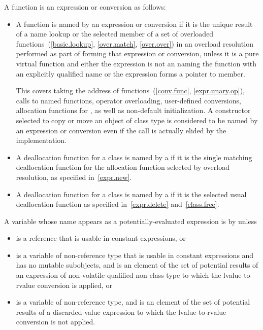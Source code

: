 \pnum
A function is 
an expression or conversion as follows:
\begin{itemize}
\item
  A function is named by an expression or conversion
  if it is the unique result of a name lookup or the selected member
  of a set of overloaded functions~(\ref{basic.lookup}, \ref{over.match}, \ref{over.over})
  in an overload resolution performed
  as part of forming that expression or conversion,
  unless it is a pure virtual function and either
  the expression is not an  naming the function with
  an explicitly qualified name or
  the expression forms a pointer to member.
  \begin{note}
This covers
  taking the address of functions~(\ref{conv.func}, \ref{expr.unary.op}),
  calls to named functions,
  operator overloading,
  user-defined conversions,
  allocation functions for , as well as
  non-default initialization.
  A constructor selected to copy or move an object of class type
  is considered to be named by an expression or conversion
  even if the call is actually elided by the implementation.
\end{note}
\item
  A deallocation function for a class
  is named by a 
  if it is the single matching deallocation function
  for the allocation function selected by overload resolution,
  as specified in~\ref{expr.new}.
\item
  A deallocation function for a class
  is named by a 
  if it is the selected usual deallocation function
  as specified in~\ref{expr.delete} and~\ref{class.free}.
\end{itemize}

\pnum
A variable  whose name appears as a
potentially-evaluated expression 
is  by  unless
\begin{itemize}
\item
   is a reference that is
  usable in constant expressions, or
\item
   is a variable of non-reference type that is
  usable in constant expressions and has no mutable subobjects, and
   is an element of the set of potential results of an expression
  of non-volatile-qualified non-class type
  to which the lvalue-to-rvalue conversion is applied, or
\item
   is a variable of non-reference type, and
   is an element of the set of potential results
  of a discarded-value expression
  to which the lvalue-to-rvalue conversion is not applied.
\end{itemize}

